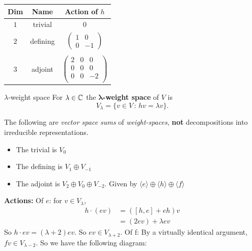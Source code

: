 \documentclass{article}
\begin{document}
\begin{table}[h]
    \centering
    \begin{tabular}{c | c | c}
        Dim & Name & Action of $h$ \\ \hline
        $1$ & trivial & $0$\\ 
        $2$ & defining & $\begin{pmatrix}
            1 & 0 \\ 0 & -1 
        \end{pmatrix}$\\ \hspace{0.1cm} & \hspace{0.1cm} & \hspace{0.1cm} \\
        $3$ & adjoint & $\begin{pmatrix}
            2 & 0 & 0\\
            0 & 0 & 0\\
            0 & 0 & -2\\
        \end{pmatrix}$
    \end{tabular}
\end{table}
\begin{fancydefine}{$\lambda$-weight space} For $\lambda \in \mathbb{C}$ the $\mathbf{\lambda}$\textbf{-weight space} of $V$ is  \[ V_{\lambda} = \{ v \in V \, : \, hv=\lambda v\}.\]
\end{fancydefine}
The following are \textit{vector space sums} of \textit{weight-spaces}, \textbf{not} decompositions into irreducible representations.
\begin{itemize}
    \item The trivial is $V_{0}$
    \item The defining is $V_{1} \oplus V_{-1}$
    \item The adjoint is $V_{2} \oplus V_{0} \oplus V_{-2}$. Given by $\langle e \rangle \oplus \langle h \rangle \oplus \langle f \rangle$
\end{itemize}
\textbf{Actions:}\gap
Of $e$: for $v \in V_{\lambda}$, \begin{align*} h \cdot (ev) &= ([h,e] + eh)v\\
    &=(2ev) + \lambda e v
\end{align*}
So $h \cdot ev = (\lambda + 2)ev$. So $ev \in V_{\lambda + 2}$.
\gap
Of f: By a virtually identical argument, $fv \in V_{\lambda-2}$. So we have the following diagram: 
\begin{center}
\end{center}
\end{document}
